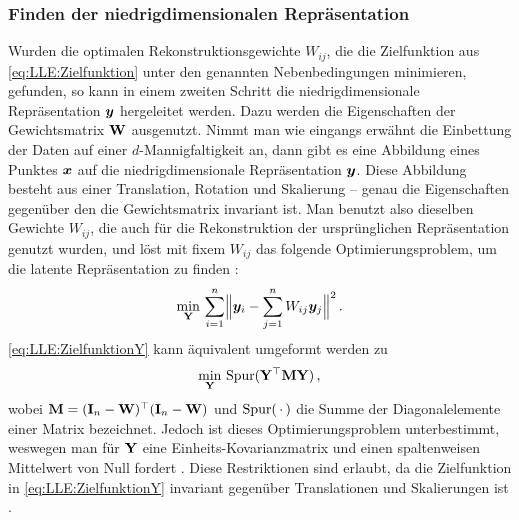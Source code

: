 \subsubsection{Finden der niedrigdimensionalen Repräsentation}
\label{ch:MethodenDerDimRed:statistisch:LLE:FindenDerRepr}
Wurden die optimalen Rekonstruktionsgewichte $W_{ij}$, die die Zielfunktion aus
\eqref{eq:LLE:Zielfunktion} unter den genannten Nebenbedingungen minimieren, gefunden, so kann in einem zweiten Schritt die niedrigdimensionale Repräsentation $\bm{y}$ hergeleitet werden. Dazu werden die Eigenschaften der Gewichtsmatrix $\mathbf{W}$ ausgenutzt. Nimmt man wie eingangs erwähnt die Einbettung der Daten auf einer $d$-Mannigfaltigkeit an, dann gibt es eine Abbildung eines Punktes $\bm{x}$ auf die niedrigdimensionale Repräsentation $\bm{y}$. Diese Abbildung besteht aus einer Translation, Rotation und Skalierung -- genau die Eigenschaften gegenüber den die Gewichtsmatrix invariant ist. Man benutzt also dieselben Gewichte $W_{ij}$, die auch für die Rekonstruktion der ursprünglichen Repräsentation genutzt wurden, und löst mit fixem $W_{ij}$ das folgende Optimierungsproblem, um die latente Repräsentation zu finden \parencite[2324]{Roweis.2000}:
\begin{equation}
	\label{eq:LLE:ZielfunktionY}
	\min_{\mat{Y}}\, \sum_{i = 1}^n \norm[\Big]{\vect{y}_i - \sum_{j = 1}^n W_{ij}\vect{y}_j}^2 \, .
\end{equation}
\eqref{eq:LLE:ZielfunktionY} kann äquivalent umgeformt werden zu \parencite[4]{Ghojogh.2020}
\begin{equation}
	\min_{\mathbf{Y}}\, \operatorname{Spur}(\mathbf{Y}^\top \mathbf{M} \mathbf{Y}) \, ,
\end{equation}
wobei $\mathbf{M} = (\mathbf{I}_n - \mathbf{W})^\top (\mathbf{I}_n - \mathbf{W})$ und $\operatorname{Spur}(\,\cdot\,)$ die Summe der Diagonalelemente einer Matrix bezeichnet. Jedoch ist dieses Optimierungsproblem unterbestimmt, weswegen man für $\mathbf{Y}$ eine Einheits-Kovarianzmatrix und einen spaltenweisen Mittelwert von Null fordert \parencite[11]{Saul.2000}. Diese Restriktionen sind erlaubt, da die Zielfunktion in
\eqref{eq:LLE:ZielfunktionY} invariant gegenüber Translationen und Skalierungen ist \parencite[2326]{Roweis.2000}.

